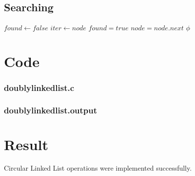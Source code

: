 \subsection{Searching}

\begin{algorithmic}
		\State $found \gets false$
			\State $iter \gets node$
			\Repeat
					\State $found = true$
				\EndIf
				\State $node = node.next$
		\EndIf
		\State \Return $\phi$
	\EndFunction
\end{algorithmic}

\section{Code}

\subsubsection{doublylinkedlist.c}

% 

\subsubsection{doublylinkedlist.output}

% 


\section{Result}
Circular Linked List operations were implemented successfully.